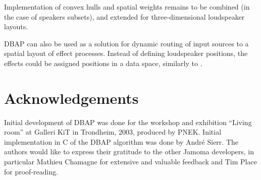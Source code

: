 \documentclass[twoside,10pt]{article}
\begin{document}
Implementation of convex hulls and spatial weights remains to be combined (in the case of speakers subsets), and extended for three-dimensional loudspeaker layouts. 


DBAP can also be used as a solution for dynamic routing of input sources to a spatial layout of effect processes. Instead of defining loudspeaker positions, the effects could be assigned positions in a data space, similarly to
\cite{Momeni:2003hipnoscope}. 


\section{Acknowledgements}

Initial development of DBAP was done for the workshop and exhibition ``Living room'' at Galleri KiT in Trondheim, 2003, produced by PNEK. Initial implementation in C of the DBAP algorithm was done by Andr\'e Sierr. The authors would like to express their gratitude to the other Jamoma developers, in particular Mathieu Chamagne for extensive and valuable feedback and Tim Place for proof-reading. 




\end{document}
